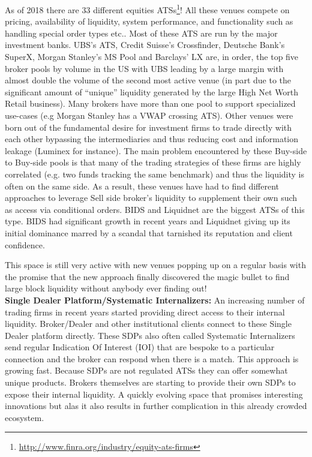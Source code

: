 As of 2018 there are 33 different equities ATSs\footnote{\url{http://www.finra.org/industry/equity-ats-firms}}!  All these venues compete on pricing, availability of liquidity, system performance, and functionality such as handling special order types etc.. Most of these ATS are run by the major investment banks. UBS's ATS, Credit Suisse's Crossfinder, Deutsche Bank's SuperX, Morgan Stanley's MS Pool and Barclays' LX are, in order,  the top five broker pools by volume in the US with UBS leading by a large margin with almost double the volume of the second most active venue (in part due to the significant amount of ``unique'' liquidity generated by the large High Net Worth Retail business). Many brokers have more than one pool to support specialized use-cases (e.g Morgan Stanley has a VWAP crossing ATS). Other venues were born out of the fundamental desire for investment firms to trade directly with each other bypassing the intermediaries and  thus reducing cost and information leakage (Luminex for instance). The main problem encountered by these Buy-side to Buy-side pools is that many of the trading strategies of these firms are highly correlated (e.g. two funds tracking the same benchmark) and thus the liquidity is often  on the same side. As a result, these venues have had to find different approaches to leverage Sell side broker's liquidity to supplement their own such as access via conditional orders. BIDS and Liquidnet  are the biggest ATSs of this type. BIDS had significant growth in recent years and Liquidnet giving up its initial dominance marred by a scandal that tarnished its reputation and client confidence.


This space is still very active with new venues popping up on a regular basis with the promise that the new approach finally discovered the magic bullet to find large block liquidity without anybody ever finding out! \\


\noindent\textbf{Single Dealer Platform/Systematic Internalizers:} An increasing number of trading firms in recent years started providing direct access to their internal liquidity. Broker/Dealer and other institutional clients connect to these Single Dealer platform directly. These SDPs also often called Systematic Internalizers send regular Indication Of Interest (IOI)  that are bespoke to a particular connection and the broker can respond when there is a match. This approach is growing fast. Because SDPs are not regulated ATSs they can offer somewhat unique products. Brokers themselves are starting to provide their own SDPs to expose their internal liquidity. A quickly evolving space that promises interesting innovations but alas it also results in further complication in this already crowded ecosystem. \\


